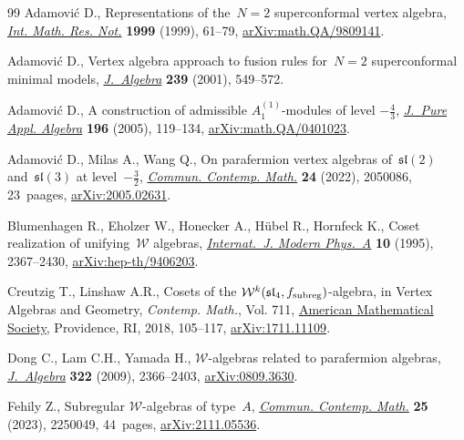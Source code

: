\documentclass[11pt]{article}
\numberwithin{equation}{section}
\begin{document}
\begin{thebibliography}{99}
Adamovi\'c D., Representations of the~{$N=2$} superconformal vertex algebra,
 \href{https://doi.org/10.1155/S1073792899000033}{\textit{Int. Math. Res. Not.}} \textbf{1999} (1999), 61--79,
 \href{http://arxiv.org/abs/math.QA/9809141}{arXiv:math.QA/9809141}.

Adamovi\'c D., Vertex algebra approach to fusion rules for~${N=2}$
 superconformal minimal models,
 \href{https://doi.org/10.1006/jabr.2000.8728}{\textit{J.~Algebra}}
 \textbf{239} (2001), 549--572.

Adamovi\'c D., A construction of admissible {$A^{(1)}_1$}-modules of level
 {$-\frac 43$},
 \href{https://doi.org/10.1016/j.jpaa.2004.08.007}{\textit{J.~Pure Appl.
 Algebra}} \textbf{196} (2005), 119--134,
 \href{http://arxiv.org/abs/math.QA/0401023}{arXiv:math.QA/0401023}.

Adamovi\'c D., Milas A., Wang Q., On parafermion vertex algebras
 of~{$\mathfrak{sl}(2)$} and~{$\mathfrak{sl}(3)$} at level~{$-\frac32$},
 \href{https://doi.org/10.1142/S0219199720500868}{\textit{Commun. Contemp.
 Math.}} \textbf{24} (2022), 2050086, 23~paages,
 \href{http://arxiv.org/abs/2005.02631}{arXiv:2005.02631}.

Blumenhagen R., Eholzer W., Honecker A., H\"{u}bel R., Hornfeck K., Coset
 realization of unifying~{$\mathcal W$} algebras,
 \href{https://doi.org/10.1142/S0217751X95001157}{\textit{Internat.~J. Modern
 Phys.~A}} \textbf{10} (1995), 2367--2430,
 \href{http://arxiv.org/abs/hep-th/9406203}{arXiv:hep-th/9406203}.

Creutzig T., Linshaw A.R., Cosets of the {$\mathcal{W}^k(\mathfrak{sl}_4,
 f_{\rm subreg})$}-algebra, in Vertex {A}lgebras and {G}eometry,
 \textit{Contemp. Math.}, Vol. 711,
 \href{https://doi.org/10.1090/conm/711/14301}{American Mathematical Society},
 Providence, RI, 2018, 105--117,
 \href{http://arxiv.org/abs/1711.11109}{arXiv:1711.11109}.

Dong C., Lam C.H., Yamada H., {$\mathcal W$}-algebras related to parafermion
 algebras,
 \href{https://doi.org/10.1016/j.jalgebra.2009.03.034}{\textit{J.~Algebra}}
 \textbf{322} (2009), 2366--2403,
 \href{http://arxiv.org/abs/0809.3630}{arXiv:0809.3630}.

Fehily Z., Subregular {$\mathcal W$}-algebras of type~{$A$},
 \href{https://doi.org/10.1142/S0219199722500493}{\textit{Commun. Contemp.
 Math.}} \textbf{25} (2023), 2250049, 44~pages,
 \href{http://arxiv.org/abs/2111.05536}{arXiv:2111.05536}.


\end{thebibliography}
\end{document}
